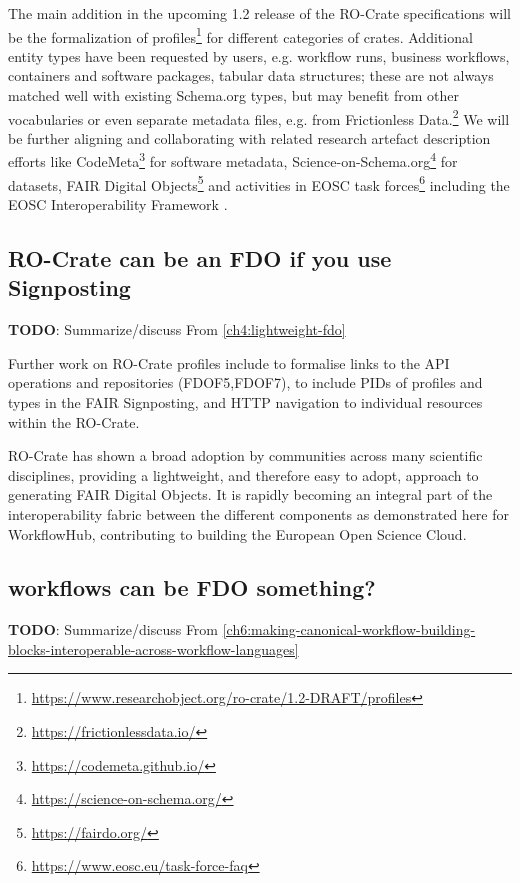 The main addition in the upcoming 1.2 release of the RO-Crate
specifications will be the formalization of
profiles\footnote{\url{https://www.researchobject.org/ro-crate/1.2-DRAFT/profiles}}
for different categories of crates. Additional entity types have been
requested by users, e.g. workflow runs, business workflows, containers
and software packages, tabular data structures; these are not always
matched well with existing Schema.org types, but may benefit from other
vocabularies or even separate metadata files, e.g. from Frictionless
Data.\footnote{\url{https://frictionlessdata.io/}} We will be further aligning
and collaborating with related research artefact description efforts
like CodeMeta\footnote{\url{https://codemeta.github.io/}} for software metadata,
Science-on-Schema.org\footnote{\url{https://science-on-schema.org/}}
\cite{ch5-66} for datasets, FAIR Digital
Objects\footnote{\url{https://fairdo.org/}} \cite{De Smedt 2020} and
activities in EOSC task forces\footnote{\url{https://www.eosc.eu/task-force-faq}}
including the EOSC Interoperability Framework \cite{eosc-interop-framework}.




\subsection{RO-Crate can be an FDO if you use Signposting}

\textbf{TODO}: Summarize/discuss 
From \vref{ch4:lightweight-fdo}

Further work on RO-Crate profiles include to formalise links to the API
operations and repositories (FDOF5,FDOF7), to include PIDs of
profiles and types in the FAIR Signposting, and HTTP navigation to
individual resources within the RO-Crate.

RO-Crate has shown a broad adoption by communities across many
scientific disciplines, providing a lightweight, and therefore easy to
adopt, approach to generating FAIR Digital Objects. It is rapidly
becoming an integral part of the interoperability fabric between the
different components as demonstrated here for WorkflowHub, contributing
to building the European Open Science Cloud.


\subsection{workflows can be FDO something?}

\textbf{TODO}: Summarize/discuss 
From \vref{ch6:making-canonical-workflow-building-blocks-interoperable-across-workflow-languages}

